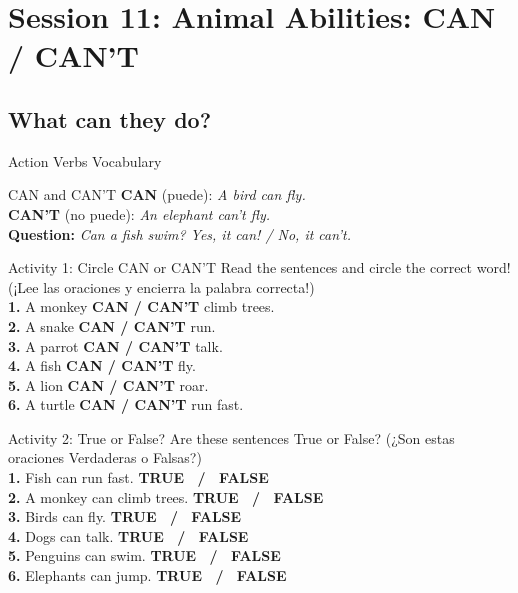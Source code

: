 \section*{Session 11: Animal Abilities: CAN / CAN'T}
\subsection*{What can they do?}

\begin{vocabcard}{Action Verbs Vocabulary}
\end{vocabcard}

\begin{grammartip}{CAN and CAN'T}
  \textbf{CAN} (puede): \emph{A bird can fly.}\\
  \textbf{CAN'T} (no puede): \emph{An elephant can't fly.}\\
  \textbf{Question:} \emph{Can a fish swim? Yes, it can! / No, it can't.}
\end{grammartip}

\begin{activity}{Activity 1: Circle CAN or CAN'T}
  Read the sentences and circle the correct word! (¡Lee las oraciones y encierra la palabra correcta!)\\
  \textbf{1.} A monkey \textbf{CAN / CAN'T} climb trees.\\
  \textbf{2.} A snake \textbf{CAN / CAN'T} run.\\
  \textbf{3.} A parrot \textbf{CAN / CAN'T} talk.\\
  \textbf{4.} A fish \textbf{CAN / CAN'T} fly.\\
  \textbf{5.} A lion \textbf{CAN / CAN'T} roar.\\
  \textbf{6.} A turtle \textbf{CAN / CAN'T} run fast.
\end{activity}

\begin{activity}{Activity 2: True or False?}
  Are these sentences True or False? (¿Son estas oraciones Verdaderas o Falsas?)\\
  \textbf{1.} Fish can run fast. \hfill \textbf{TRUE \ / \ FALSE}\\
  \textbf{2.} A monkey can climb trees. \hfill \textbf{TRUE \ / \ FALSE}\\
  \textbf{3.} Birds can fly. \hfill \textbf{TRUE \ / \ FALSE}\\
  \textbf{4.} Dogs can talk. \hfill \textbf{TRUE \ / \ FALSE}\\
  \textbf{5.} Penguins can swim. \hfill \textbf{TRUE \ / \ FALSE}\\
  \textbf{6.} Elephants can jump. \hfill \textbf{TRUE \ / \ FALSE}
\end{activity}

